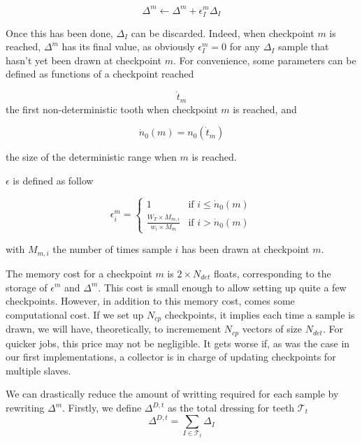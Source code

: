 \documentclass[./thesis.tex]{subfiles}
\begin{document}
\begin{equation}
\Delta^m \gets \Delta^m + \epsilon_I^{m} \Delta_I
\end{equation}


Once this has been done, $\Delta_I$ can be discarded. Indeed, when checkpoint $m$ is reached, $\Delta^{m}$ has its final value, as obviously $\epsilon_I^{m} = 0$ for any $\Delta_I$ sample that hasn't yet been drawn at checkpoint ${m}$.
For convenience, some parameters can be defined as functions of a checkpoint reached

\begin{equation}
\dot t_m
\end{equation}
the first non-deterministic tooth when checkpoint $m$ is reached, and

\begin{equation}
\dot n_0(m) = n_0(\dot t_m)
\end{equation}

the size of the deterministic range when $m$ is reached.


$\epsilon$ is defined as follow

\begin{equation}
\epsilon^m_i = 
\begin{cases}
1 & \text{if } i \leq \dot n_0(m) \\
\frac{W_T \times M_{m,i}}{w_i \times M_m} & \text{if } i > \dot n_0(m)
\end{cases}
\end{equation}


with $M_{m,i}$ the number of times sample $i$ has been drawn at checkpoint $m$.


The memory cost for a checkpoint $m$ is $2 \times N_{det}$ floats, corresponding to the storage of $\epsilon^m$ and $\Delta^m$. This cost is small enough to allow setting up quite a few checkpoints. However, in addition to this memory cost, comes some computational cost. If we set up $N_{cp}$ checkpoints, it implies each time a sample is drawn, we will have, theoretically, to incremement $N_{cp}$ vectors of size $N_{det}$. For quicker jobs, this price may not be negligible. It gets worse if, as was the case in our first implementations, a collector is in charge of updating checkpoints for multiple slaves. 


We can drastically reduce the amount of writting required for each sample by rewriting $\Delta^m$.
Firstly, we define $\Delta^{D,t}$ as the total dressing for teeth $\mathcal{T}_t$
\begin{equation}
\Delta^{D,t} = \sum_{I \in \mathcal{T}_t} \Delta_I
\end{equation}
\end{document}
